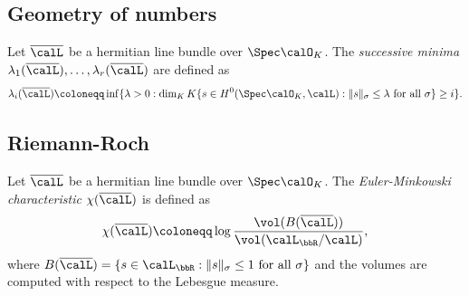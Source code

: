 \subsection{Geometry of numbers}


    \begin{definition}\label{def:successive_minima_geometry}
        Let \(\overline{\calL}\) be a hermitian line bundle over \(\Spec \calO_K\). 
        The \emph{successive minima} \(\lambda_1(\overline{\calL}), \ldots, \lambda_r(\overline{\calL})\) are defined as
        \[
            \lambda_i(\overline{\calL}) \coloneqq \inf \{ \lambda > 0 : \dim_K K \{ s \in H^0(\Spec \calO_K, \calL) : \|s\|_\sigma \leq \lambda \text{ for all } \sigma \} \geq i \}.
        \]
    \end{definition}


\subsection{Riemann-Roch}

    \begin{definition}\label{def:Euler-Minkowski_characteristic_of_line_bundles}
        Let \(\overline{\calL}\) be a hermitian line bundle over \(\Spec \calO_K\). 
        The \emph{Euler-Minkowski characteristic} \(\chi(\overline{\calL})\) is defined as
        \[
            \chi(\overline{\calL}) \coloneqq \log \frac{\vol(B(\overline{\calL}))}{\vol(\calL_\bbR / \calL)},
        \]
        where \(B(\overline{\calL}) = \{ s \in \calL_\bbR : \|s\|_\sigma \leq 1 \text{ for all } \sigma \}\) and the volumes are computed with respect to the Lebesgue measure.
        
    \end{definition}